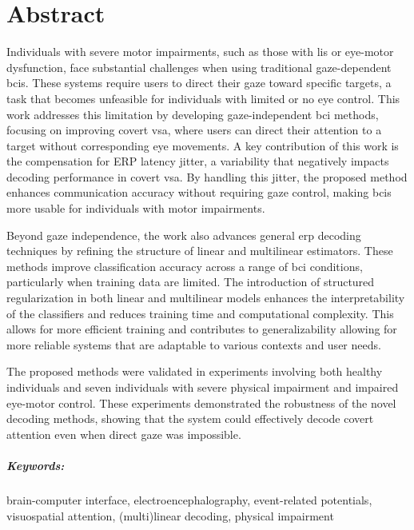 \chapter*{Abstract}

Individuals with severe motor impairments, such as those with \ac{lis}
or eye-motor dysfunction, face substantial challenges when using traditional
gaze-dependent \acp{bci}.
These systems require users to direct their gaze toward specific targets, a
task that becomes unfeasible for individuals with limited or no eye control.
This work addresses this limitation by developing gaze-independent
\ac{bci} methods, focusing on improving covert \ac{vsa}, where users can direct
their attention to a target without corresponding eye movements.
A key contribution of this work is the compensation for ERP latency jitter, a
variability that negatively impacts decoding performance in covert \ac{vsa}.
By handling this jitter, the proposed method enhances communication accuracy
without requiring gaze control, making \acp{bci} more usable for individuals with
motor impairments.

Beyond gaze independence, the work also advances general \ac{erp} decoding
techniques by refining the structure of linear and multilinear estimators.
These methods improve classification accuracy across a range of \ac{bci}
conditions, particularly when training data are limited.
The introduction of structured regularization in both linear and multilinear
models enhances the interpretability of the classifiers and reduces training
time and computational complexity.
This allows for more efficient training and contributes to generalizability
allowing for more reliable systems that are adaptable to various contexts and
user needs.

The proposed methods were validated in experiments involving both healthy
individuals and seven individuals with severe physical impairment and impaired eye-motor control.
These experiments demonstrated the robustness of the novel decoding methods,
showing that the system could effectively decode covert attention even when
direct gaze was impossible.

\paragraph{Keywords:} brain-computer interface, electroencephalography,
event-related potentials, visuospatial attention, (multi)linear
decoding, physical impairment
